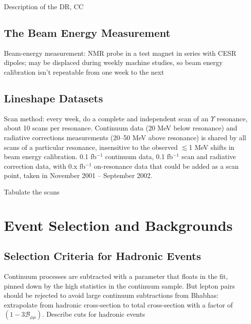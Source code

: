 \documentclass[aps,prd,preprint,superscriptaddress,tightenlines,nofootinbib,floatfix]{revtex4}
\begin{document}
Description of the DR, CC

%
\subsection{The Beam Energy Measurement}
%

Beam-energy measurement: NMR probe in a test magnet in series with
CESR dipoles; may be displaced during weekly machine studies, so beam
energy calibration isn't repeatable from one week to the next

%
\subsection{Lineshape Datasets}
%

Scan method: every week, do a complete and independent scan of an
$\Upsilon$ resonance, about 10 scans per resonance.  Continuum data
(20 MeV below resonance) and radiative corrections measurements
(20--50 MeV above resonance) is shared by all scans of a particular
resonance, insensitive to the observed $\lesssim$1 MeV shifts in beam
energy calibration.  0.1 fb$^{-1}$ continuum data, 0.1 fb$^{-1}$ scan and
radiative correction data, with 0.x fb$^{-1}$ on-resonance data that
could be added as a scan point, taken in November 2001 -- September 2002.

Tabulate the scans

%
\section{Event Selection and Backgrounds}
%

%
\subsection{Selection Criteria for Hadronic Events}
%

Continuum processes are subtracted with a parameter that floats in the
fit, pinned down by the high statistics in the continuum sample.  But
lepton pairs should be rejected to avoid large continuum subtractions
from Bhabhas: extrapolate from hadronic cross-section to total
cross-section with a factor of $(1-3\mathcal{B}_{\mu\mu})$.  Describe
cuts for hadronic events
\end{document}

